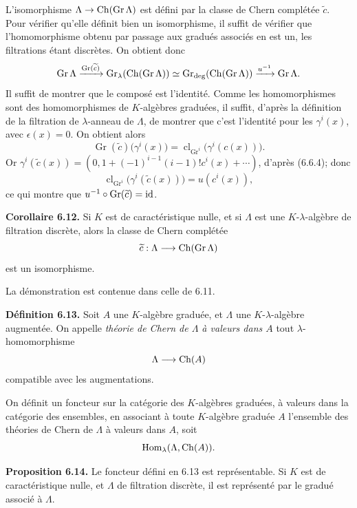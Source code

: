 \documentclass[11pt]{article}
\newcommand{\Gr}{\operatorname{Gr}}
\newcommand{\cl}{\operatorname{cl}}
\providecommand{\Gr}{\operatorname{Gr}}
\providecommand{\Gr}{\operatorname{G}}
\begin{document}
L'isomorphisme \(\Lambda\to\Ch(\Gr\Lambda)\) est défini par la classe de Chern complétée \(\widetilde c\). Pour vérifier qu'elle définit bien un isomorphisme, il suffit de vérifier que l'homomorphisme obtenu par passage aux gradués associés en est un, les filtrations étant discrètes. On obtient donc
\[
  \Gr\Lambda
   \xrightarrow{\Gr(\widetilde c)}
  \Gr_{\lambda}(\Ch(\Gr\Lambda))
   \simeq
  \Gr_{\deg}(\Ch(\Gr\Lambda))
   \xrightarrow{u^{-1}}
  \Gr\Lambda .
\]
Il suffit de montrer que le composé est l'identité. Comme les homomorphismes sont des homomorphismes de \(K\)-algèbres graduées, il suffit, d'après la définition de la filtration de \(\lambda\)-anneau de \(\Lambda\), de montrer que c'est l'identité pour les \(\gamma^i(x)\), avec \(\epsilon(x)=0\). On obtient alors
\[
  \Gr(\widetilde c)\bigl(\gamma^i(x)\bigr)
  =
  \cl_{\Gr^i}\bigl(\gamma^i(c(x))\bigr).
\]
Or \(\gamma^i(\widetilde c(x))=(0,1+(-1)^{i-1}(i-1)!c^i(x)+\cdots)\), d'après (6.6.4); donc
\[
  \cl_{\Gr^i}\bigl(\gamma^i(\widetilde c(x))\bigr)=u(c^i(x)),
\]
ce qui montre que \(u^{-1}\circ\Gr(\widetilde c)=\id\).

\textbf{Corollaire 6.12.} Si \(K\) est de caractéristique nulle, et si \(\Lambda\) est une \(K\)-\(\lambda\)-algèbre de filtration discrète, alors la classe de Chern complétée
\[
  \widetilde c:\Lambda\longrightarrow \Ch(\Gr\Lambda)
\]
est un isomorphisme.

La démonstration est contenue dans celle de 6.11.

\textbf{Définition 6.13.} Soit \(A\) une \(K\)-algèbre graduée, et \(\Lambda\) une \(K\)-\(\lambda\)-algèbre augmentée. On appelle \emph{théorie de Chern de \(\Lambda\) à valeurs dans \(A\)} tout \(\lambda\)-homomorphisme
\[
  \Lambda\longrightarrow \operatorname{Ch}(A)
\]
compatible avec les augmentations.

On définit un foncteur sur la catégorie des \(K\)-algèbres graduées, à valeurs dans la catégorie des ensembles, en associant à toute \(K\)-algèbre graduée \(A\) l'ensemble des théories de Chern de \(\Lambda\) à valeurs dans \(A\), soit
\[
  \operatorname{Hom}_\lambda(\Lambda,\operatorname{Ch}(A)).
\]

\textbf{Proposition 6.14.} Le foncteur défini en 6.13 est représentable. Si \(K\) est de caractéristique nulle, et \(\Lambda\) de filtration discrète, il est représenté par le gradué associé à \(\Lambda\).
\end{document}
